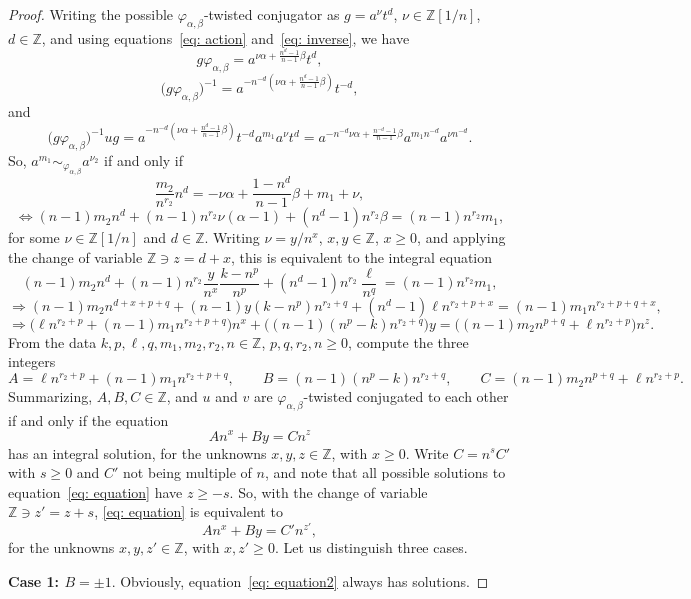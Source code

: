 \documentclass[10pt,a4paper]{amsart}
\newcommand\ZZ{\mathbb{Z}}
\begin{document}
\begin{proof}
Writing the possible $\varphi_{\alpha, \beta}$-twisted conjugator as $g=a^{\nu}t^d$, $\nu\in \ZZ[1/n]$, $d\in \ZZ$, and using equations~\eqref{eq: action} and~\eqref{eq: inverse}, we have 
 $$
g\varphi_{\alpha,\beta} =a^{\nu \alpha + \frac{n^{d}-1}{n-1}\beta}t^{d},
 $$
 $$
\big( g\varphi_{\alpha,\beta} \big)^{-1} =a^{-n^{-d}(\nu \alpha + \frac{n^{d}-1}{n-1}\beta)}t^{-d},
 $$
and 
 $$
\big( g\varphi_{\alpha,\beta} \big)^{-1} ug= a^{-n^{-d}(\nu \alpha + \frac{n^{d}-1}{n-1}\beta)} t^{-d} a^{m_1} a^{\nu}t^d= a^{-n^{-d}\nu \alpha + \frac{n^{-d}-1}{n-1}\beta} a^{m_1 n^{-d}} a^{\nu n^{-d}}.
 $$
So, $a^{m_1}\sim_{\varphi_{\alpha, \beta}} a^{\nu_2}$ if and only if 
 $$
\frac{m_2}{n^{r_2}} n^d =-\nu \alpha +\frac{1-n^{d}}{n-1}\beta +m_1 +\nu, 
 $$
 $$
\Leftrightarrow (n-1)m_2 n^d +(n-1)n^{r_2}\nu (\alpha -1) +(n^{d}-1)n^{r_2}\beta =(n-1)n^{r_2}m_1, 
 $$
for some $\nu\in \ZZ[1/n]$ and $d\in \ZZ$. Writing $\nu =y/n^x$, $x,y\in \ZZ$, $x\geq 0$, and applying the change of variable $\ZZ \ni z=d+x$, this is equivalent to the integral equation  
 $$
(n-1)m_2 n^d +(n-1)n^{r_2}\frac{y}{n^x} \frac{k-n^p}{n^p} +(n^{d}-1)n^{r_2}\frac{\ell}{n^q} =(n-1)n^{r_2}m_1, 
 $$
 $$
\Rightarrow (n-1)m_2 n^{d+x+p+q} +(n-1)y(k-n^p)n^{r_2+q} +(n^{d}-1)\ell n^{r_2+p+x} =(n-1)m_1 n^{r_2+p+q+x}, 
 $$
 $$
\Rightarrow \Big( \ell n^{r_2+p}+(n-1)m_1 n^{r_2+p+q}\Big) n^x +\Big( (n-1)(n^p-k)n^{r_2+q} \Big) y =\Big( (n-1)m_2 n^{p+q} +\ell n^{r_2+p}\Big) n^{z}.
 $$
From the data $k, p, \ell, q, m_1, m_2, r_2, n\in \ZZ$, $p,q,r_2,n\geq 0$, compute the three integers 
 $$
A=\ell n^{r_2+p}+(n-1)m_1 n^{r_2+p+q},\qquad B=(n-1)(n^p-k)n^{r_2+q}, \qquad C=(n-1)m_2 n^{p+q}+\ell n^{r_2+p}.
 $$
Summarizing, $A,B,C\in \ZZ$, and $u$ and $v$ are $\varphi_{\alpha, \beta}$-twisted conjugated to each other if and only if the equation 
 \begin{equation}\label{eq: equation}
An^x +By=Cn^z
 \end{equation}
has an integral solution, for the unknowns $x,y,z\in \ZZ$, with $x\geq 0$. Write $C=n^s C'$ with $s\geq 0$ and $C'$ not being multiple of $n$, and note that all possible solutions to equation~\eqref{eq: equation} have $z\geq -s$. So, with the change of variable $\ZZ \ni z'=z+s$, \eqref{eq: equation} is equivalent to 
 \begin{equation}\label{eq: equation2}
An^x +By=C'n^{z'},
 \end{equation}
for the unknowns $x,y,z'\in \ZZ$, with $x,z'\geq 0$. Let us distinguish three cases. 

\textbf{Case 1: $B=\pm 1$}. Obviously, equation~\eqref{eq: equation2} always has solutions.  


\end{proof}
\end{document}
